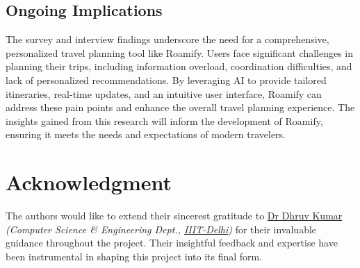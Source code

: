 \documentclass[conference]{IEEEtran}
\begin{document}
    \subsection{Ongoing Implications}
        The survey and interview findings underscore the need for a comprehensive, personalized travel planning tool like Roamify. Users face significant challenges in planning their trips, including information overload, coordination difficulties, and lack of personalized recommendations. By leveraging AI to provide tailored itineraries, real-time updates, and an intuitive user interface, Roamify can address these pain points and enhance the overall travel planning experience. The insights gained from this research will inform the development of Roamify, ensuring it meets the needs and expectations of modern travelers.


\section*{Acknowledgment}
    The authors would like to extend their sincerest gratitude to \href{https://www.iiitd.ac.in/dhruv}{Dr Dhruv Kumar} \textit{(Computer Science \& Engineering Dept., \href{https://www.iiitd.ac.in/}{IIIT-Delhi})} for their invaluable guidance throughout the project. Their insightful feedback and expertise have been instrumental in shaping this project into its final form.


\newpage
\end{document}
